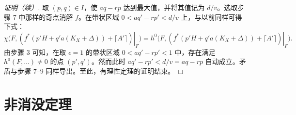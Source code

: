 \begin{proof}[证明（续）]
取 $(p,q)\in I$，使 $aq-rp$ 达到最大值，并将其值记为 $d/v$。选取步骤 7 中那样的奇点消解 $f$。在带状区域 $0<aq'-rp'<d/v$ 上，与以前同样可得下式：
\[
\chi\bigl(F,\left.(f^*(p'H+q'a(K_X+\Delta))+\lceil A'\rceil)\right|_F\bigr)
=h^0\bigl(F,\left.(f^*(p'H+q'a(K_X+\Delta))+\lceil A'\rceil)\right|_F\bigr).
\]
由步骤 3 可知，在取 $\epsilon=1$ 的带状区域 $0<aq'-rp'<1$ 中，存在满足 $h^0(F,\ldots)\neq 0$ 的点 $(p',q')$。然而此时 $aq'-rp'<d/v=aq-rp$ 自动成立。矛盾与步骤 7--9 同样导出。至此，有理性定理的证明结束。
\end{proof}

\section{非消没定理}

